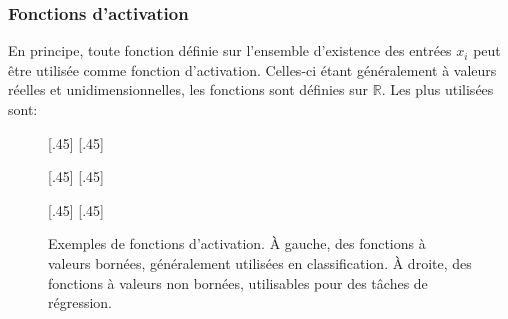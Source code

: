 \subsubsection{Fonctions d'activation}\label{chapter-ML-section-DNN-neuron-activ_fct}
En principe, toute fonction définie sur l'ensemble d'existence des entrées $x_i$ peut être utilisée comme fonction d'activation.
Celles-ci étant généralement à valeurs réelles et unidimensionnelles, les fonctions sont définies sur $\mathbb{R}$.
Les plus utilisées sont:
\begin{figure}[p]
\centering

[.45\textwidth]
{\vspace{-\baselineskip}}
\hfill
{}[.45\textwidth]
{\vspace{-\baselineskip}}

\vspace{.5\baselineskip}

[.45\textwidth]
{\vspace{-\baselineskip}}
\hfill
{}[.45\textwidth]
{\vspace{-\baselineskip}}

\vspace{.5\baselineskip}

[.45\textwidth]
{\vspace{-\baselineskip}}
\hfill
{}[.45\textwidth]
{\vspace{-\baselineskip}}

\vspace{.5\baselineskip}

\caption[Exemples de fonctions d'activation.]{Exemples de fonctions d'activation. À gauche, des fonctions à valeurs bornées, généralement utilisées en classification. À droite, des fonctions à valeurs non bornées, utilisables pour des tâches de régression.}
\label{fig-act_fct}
\end{figure}
